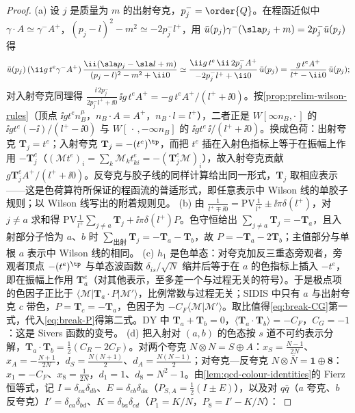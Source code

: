 \begin{proof}
(a) 设 $j$ 是质量为 $m$ 的出射夸克，$p_j^-=\order{Q}$。在程函近似中 $\gamma\cdot A\simeq\gamma^-A^+$，$(p_j-l)^2-m^2\simeq-2p_j^-l^+$，用 $\bar u(p_j)\gamma^-(\sla p_j+m)=2p_j^-\bar u(p_j)$ 得
\[
\bar u(p_j)\,(\ii g\,t^e\gamma^-A^+)\,\frac{\ii(\sla p_j-\sla l+m)}{(p_j-l)^2-m^2+\ii0}\simeq\frac{\ii g\,t^e\,\ii\,2p_j^-A^+}{-2p_j^-l^++\ii0}\,\bar u(p_j)=\frac{g\,t^e A^+}{l^+-\ii0}\,\bar u(p_j);
\]
对入射夸克同理得 $\frac{\ii\,2p_j^-}{2p_j^-l^++\ii0}\,\ii g\,t^eA^+=-g\,t^eA^+/(l^++\ii0)$。按\cref{prop:prelim-wilson-rules}（顶点 $\ii gt^en_B^\mu$，$n_B\cdot A=A^+$，$n_B\cdot l=l^+$），二者正是 $W[\infty n_B,\cdot\,]$ 的 $\ii gt^e(-\ii)/(l^+-\ii0)$ 与 $W[\,\cdot\,,-\infty n_B]$ 的 $\ii gt^e\,\ii/(l^++\ii0)$。换成色荷：出射夸克 $\mathbf T_j=t^e$；入射夸克 $\mathbf T_j=-(t^e)^{\tp}$，而把 $t^e$ 插在入射色指标上等于在振幅上作用 $-\mathbf T_j^e$（$(\mathcal Mt^e)_i=\sum_k\mathcal M_kt^e_{ki}=-(\mathbf T_j^e\mathcal M)_i$），故入射夸克贡献 $g\mathbf T_j^eA^+/(l^++\ii0)$。反夸克与胶子线的同样计算给出同一形式，$\mathbf T_j$ 取相应表示——这是色荷算符所保证的程函流的普适形式\cite{CataniSeymour1997}，即任意表示中 Wilson 线的单胶子规则；以 Wilson 线写出的附着规则见\cite{Buffing:2011mj}。
(b) 由 $\frac{1}{l^+\mp\ii0}=\mathrm{PV}\frac1{l^+}\pm\ii\pi\delta(l^+)$，对 $j\neq a$ 求和得 $\mathrm{PV}\frac1{l^+}\sum_{j\neq a}\mathbf T_j+\ii\pi\delta(l^+)P$。色守恒给出 $\sum_{j\neq a}\mathbf T_j=-\mathbf T_a$，且入射部分子恰为 $a$、$b$ 时 $\sum_{\text{出射}}\mathbf T_j=-\mathbf T_a-\mathbf T_b$，故 $P=-\mathbf T_a-2\mathbf T_b$；主值部分与单根 $a$ 表示中 Wilson 线的相同。
(c) $h_1$ 是色单态：对夸克加反三重态旁观者，旁观者顶点 $-(t^e)^{\tp}$ 与单态波函数 $\delta_{is}/\sqrt N$ 缩并后等于在 $a$ 的色指标上插入 $-t^e$，即在振幅上作用 $\mathbf T_a^e$（对其他表示，至多差一个与过程无关的符号）。于是极点项的色因子正比于 $\langle\mathcal M|\mathbf T_a\cdot P|\mathcal M'\rangle$，比例常数与过程无关；SIDIS 中只有 $a$ 与出射夸克 $c$ 带色，$P=\mathbf T_c=-\mathbf T_a$，色因子为 $-C_F\langle\mathcal M|\mathcal M'\rangle$。取比值得\cref{eq:break-CG}第一式，代入\cref{eq:break-P}得第二式。DY 中 $\mathbf T_a+\mathbf T_b=0$，$\langle\mathbf T_a\cdot\mathbf T_b\rangle=-C_F$，$C_G=-1$：这是 Sivers 函数的变号。
(d) 把入射对 $(a,b)$ 的色态按 $s$ 道不可约表示分解，$\mathbf T_a\cdot\mathbf T_b=\frac12(C_R-2C_F)$。对两个夸克 $N\otimes N=S\oplus A$：$x_S=\frac{N-1}{2N}$、$x_A=-\frac{N+1}{2N}$，$d_S=\frac{N(N+1)}2$、$d_A=\frac{N(N-1)}2$；对夸克—反夸克 $N\otimes\bar N=\mathbf 1\oplus\mathbf 8$：$x_1=-C_F$、$x_8=\frac1{2N}$，$d_1=1$、$d_8=N^2-1$。由\cref{lem:qcd-colour-identities}的 Fierz 恒等式，记 $I=\delta_{ca}\delta_{db}$、$E=\delta_{cb}\delta_{da}$（$P_{S,A}=\frac12(I\pm E)$），以及对 $q\bar q$（$a$ 夸克、$b$ 反夸克）$I'=\delta_{ca}\delta_{bd}$、$K=\delta_{ba}\delta_{cd}$（$P_1=K/N$，$P_8=I'-K/N$）：

\end{proof}
